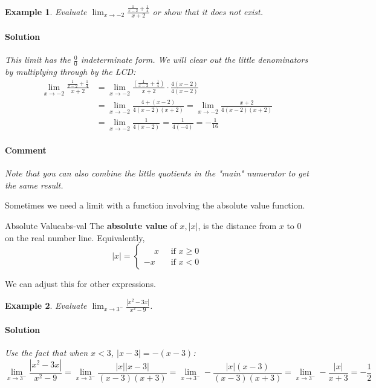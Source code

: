 \documentclass[letterpaper, 11pt, openany]{book}
\theoremstyle{mytheoremstyle}
\theoremstyle{myexamplestyle}
\newtheorem{example}{Example}[section]
\newenvironment{solution}{\paragraph{\sffamily \smaller \fontseries{b}\selectfont Solution}}{\hfill\faSquare}
\newenvironment{commentary}{\paragraph{\sffamily \smaller \fontseries{b}\selectfont Comment}}{}
\begin{document}
\begin{example}\label{e:limit-rational-functions}
    Evaluate $\displaystyle \lim_{x\to -2} \frac{\frac{1}{x - 2} + \frac{1}{4}}{x + 2}$ or show that it does not exist.
    \begin{solution}
        This limit has the $\frac{0}{0}$ indeterminate form. We will clear out the little denominators by multiplying through by the LCD:
        \begin{align*}
            \lim_{x\to -2} \frac{\frac{1}{x - 2} + \frac{1}{4}}{x + 2}  &= \lim_{x\to -2} \frac{\left(\frac{1}{x - 2} + \frac{1}{4}\right)}{x + 2} \cdot \frac{4(x - 2)}{4(x - 2)} \\
                                                                        &= \lim_{x\to -2} \frac{4 + (x-2)}{4(x-2)(x+2)} = \lim_{x\to -2}\frac{x + 2}{4(x-2)(x+2)}\\
                                                                        &= \lim_{x\to -2} \frac{1}{4(x-2)} = \frac{1}{4(-4)} = -\frac{1}{16}
        \end{align*} 
    \end{solution}
    \begin{commentary}
        Note that you can also combine the little quotients in the "main" numerator to get the same result.
    \end{commentary}
\end{example}
Sometimes we need a limit with a function involving the absolute value function.
\begin{definition}{Absolute Value}{abs-val}
    The \textbf{absolute value} of \(x, |x| \), is the distance from \(x\) to 0 on the real number line. Equivalently,
    \[ |x| = 
    \begin{cases}
        \phantom{-}x \; &\text{ if } x \ge 0\\
        -x \; &\text{ if } x < 0
    \end{cases}
    \]
\end{definition}
We can adjust this for other expressions.

\begin{example}\label{e:limit-absval}
    Evaluate \(\displaystyle \lim_{x \to 3^{-}} \frac{|x^{2} - 3x|}{x^{2}-9}\).
    \begin{solution}
        Use the fact that when \(x<3\), \(|x-3| = -(x-3)\):
        \[\lim_{x \to 3^{-}} \frac{|x^{2} - 3x|}{x^{2}-9} = \lim_{x \to 3^{-}} \frac{|x||x-3|}{(x-3)(x+3)} = \lim_{x \to 3^{-}} -\frac{|x|(x-3)}{(x-3)(x+3)} = \lim_{x \to 3^{-}} -\frac{|x|}{x+3} = -\frac{1}{2}\]
    \end{solution}
\end{example}
\end{document}
